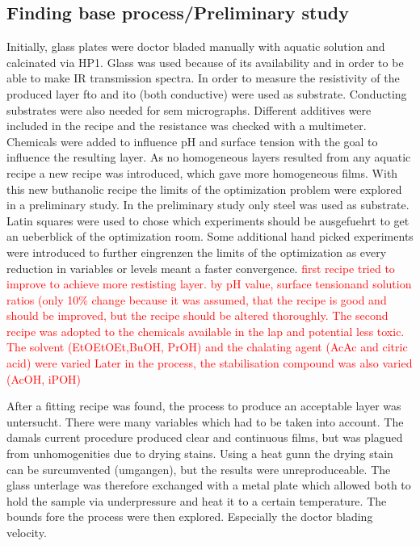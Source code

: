 \documentclass[a4paper]{article}
\newcommand{\td}[1]{\textcolor{red}{#1}}
\begin{document}
\subsection{Finding base process/Preliminary study}
Initially, glass plates were doctor bladed manually with aquatic solution and calcinated via HP1. 
Glass was used because of its availability and in order to be able to make IR transmission spectra.
In order to measure the resistivity of the produced layer \gls{fto} and \gls{ito} (both conductive) were used as substrate.
Conducting substrates were also needed for \gls{sem} micrographs. 
Different additives were included in the recipe and the resistance was checked with a multimeter. 
Chemicals were added to influence pH and surface tension with the goal to influence the resulting layer. 
As no homogeneous layers resulted from any aquatic recipe a new recipe was introduced, which gave more homogeneous films.
With this new buthanolic recipe the limits of the optimization problem were explored in a preliminary study.
In the preliminary study only steel was used as substrate.
Latin squares were used to chose which experiments should be ausgefuehrt to get an ueberblick of the optimization room.
Some additional hand picked experiments were introduced to further eingrenzen the limits of the optimization as every reduction in variables or levels meant a faster convergence.
\td{first recipe tried to improve to achieve more restisting layer. by pH value, surface tensionand solution ratios (only 10\% change because it was assumed, that the recipe is good and should be improved, but the recipe should be altered thoroughly.
The second recipe was adopted to the chemicals available in the lap and potential less toxic.
The solvent (EtOEtOEt,BuOH, PrOH) and the chalating agent (AcAc and citric acid) were varied 
Later in the process, the stabilisation compound was also varied (AcOH, iPOH)
}

After a fitting recipe was found, the process to produce an acceptable layer was untersucht. 
There were many variables which had to be taken into account. 
The damals current procedure produced clear and continuous films, but was plagued from unhomogenities due to drying stains. 
Using a heat gunn the drying stain can be surcumvented (umgangen), but the results were unreproduceable. 
The glass unterlage was therefore exchanged with a metal plate which allowed both to hold the sample via underpressure and heat it to a certain temperature.
The bounds fore the process were then explored. 
Especially the doctor blading velocity.
\end{document}

